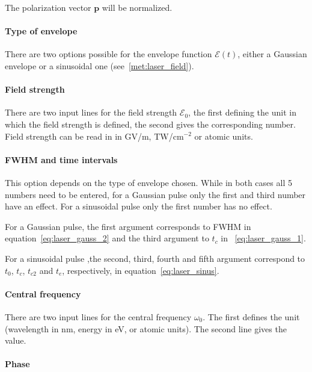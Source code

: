 \documentclass[a4paper,11pt,DIV=15,openany,twoside=false]{scrbook}
\newcommand{\VEC}[1]{\ensuremath{\mathbf{#1}}}
\begin{document}
The polarization vector $\VEC{p}$ will be normalized.

\paragraph{Type of envelope}

There are two options possible for the envelope function $\mathcal{E}(t)$, either a Gaussian envelope or a sinusoidal one (see~\ref{met:laser_field}).

\paragraph{Field strength}

There are two input lines for the field strength $\mathcal{E}_0$, the first defining the unit in which the field strength is defined, the second gives the corresponding number. Field strength can be read in in GV/m, TW/cm$^{-2}$ or atomic units.

\paragraph{FWHM and time intervals}

This option depends on the type of envelope chosen. While in both cases all 5 numbers need to be entered, for a Gaussian pulse only the first and third number have an effect. For a sinusoidal pulse only the first number has no effect.

For a Gaussian pulse, the first argument corresponds to FWHM in equation~\eqref{eq:laser_gauss_2} and the third argument to $t_c$ in ~\eqref{eq:laser_gauss_1}.

For a sinusoidal pulse ,the second, third, fourth and fifth argument correspond to $t_0$, $t_c$, $t_{c2}$ and $t_e$, respectively, in equation~\eqref{eq:laser_sinus}.

\paragraph{Central frequency}

There are two input lines for the central frequency $\omega_0$. The first defines the unit (wavelength in nm, energy in eV, or atomic units). The second line gives the value.

\paragraph{Phase}
\end{document}
